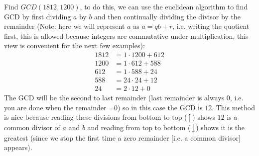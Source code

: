 \begin{example}
Find $GCD(1812,1200)$, to do this, we can use the euclidean algorithm to find GCD by first dividing $a$ by $b$ and then continually dividing the divisor by the remainder (Note: here we will represent $a$ as $a=qb+r$, i.e. writing the quotient first, this is allowed because integers are commutative under multiplication, this view is convenient for the next few examples):
\begin{align}
    1812 &=1\cdot1200+612\nonumber\\
    1200 &=1\cdot612+588 \nonumber\\
    612 &=1\cdot588+24 \nonumber\\
    588 &=24\cdot24+12 \nonumber\\
    24 &=2\cdot12+0 \nonumber
\end{align}
The GCD will be the second to last remainder (last remainder is always 0, i.e. you are done when the remainder =0) so in this case the GCD is $12$. This method is nice because reading these divisions from bottom to top ($\big\uparrow$) shows $12$ is a common divisor of $a$ and $b$ and reading from top to bottom ($\big\downarrow$) shows it is the greatest (since we stop the first time a zero remainder [i.e. a common divisor] appears).
\end{example}
